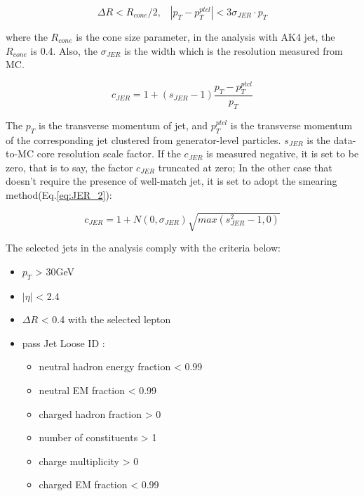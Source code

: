 		\begin{equation}
		\Delta R < R_{cone}/2, \; \; \; |p_T-p_T^{ptcl}| < 3 \sigma_{JER} \cdot p_T
		\label{eq:JER_0}
		\end{equation}
		\FloatBarrier

		where the $R_{cone}$ is the cone size parameter, in the analysis with AK4 jet, the $R_{cone}$ is 0.4. Also, the $\sigma_{JER}$ is the width which is the resolution measured from MC.

		\begin{equation}
		c_{JER} = 1 + (s_{JER} - 1)\frac{p_T-p_T^{ptcl}}{p_T}
		\label{eq:JER_1}
		\end{equation}
		\FloatBarrier

		The $p_T$ is the transverse momentum of jet, and $p_T^{ptcl}$ is the transverse momentum of the corresponding jet clustered from generator-level particles. $s_{JER}$ is the data-to-MC core resolution scale factor. If the $c_{JER}$ is measured negative, it is set to be zero, that is to say, the factor $c_{JER}$ truncated at zero; In the other case that doesn't require the presence of well-match jet, it is set to adopt the smearing method(Eq.\ref{eq:JER_2}):

		\begin{equation}
		c_{JER} = 1 + N(0,\sigma_{JER})\sqrt{max(s_{JER}^2-1,0)}
		\label{eq:JER_2}
		\end{equation}
		\FloatBarrier

		The selected jets in the analysis comply with the criteria below:

		\begin{itemize}
		\item $p_T$ > 30GeV
		\item $|\eta|$ < 2.4
		\item $\Delta R$ < 0.4 with the selected lepton
		\item pass Jet Loose ID : \cite{JetLooseID_twiki}
		\begin{itemize}
			\item neutral hadron energy fraction < 0.99
			\item neutral EM fraction < 0.99
			\item charged hadron fraction > 0
			\item number of constituents > 1
			\item charge multiplicity > 0
			\item charged EM fraction < 0.99
		\end{itemize}
		\label{PhysObj:itm:sel_jet}
		\end{itemize}
		

